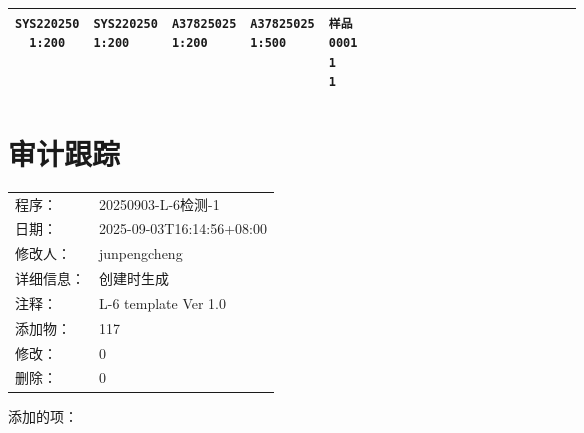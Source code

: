 \documentclass[UTF8,10pt,a4paper,fontset=fandol]{ctexart}
\newcommand{\fieldvalue}[1]{#1}
\begin{document}
\begin{center}
\begin{tabular}{c|*{12}{p{0.055\linewidth}|}}
\fieldvalue{\texttt{SYS220250\\1:200}} &
\fieldvalue{\texttt{SYS220250\\1:200}} &
\fieldvalue{\texttt{A37825025\\1:200}} &
\fieldvalue{\texttt{A37825025\\1:500}} &
\fieldvalue{\texttt{样品0001\\1\\1}} &
\\ \hline
\end{tabular}
\end{center}

\bigskip

\section*{审计跟踪}

\begin{tabular}{@{}ll@{}}
程序：&
\fieldvalue{20250903-L-6检测-1}\\
日期：&
\fieldvalue{2025-09-03T16:14:56+08:00}\\
修改人：&
\fieldvalue{junpengcheng}\\
详细信息：&
\fieldvalue{创建时生成}\\
注释：&
\fieldvalue{L-6 template Ver 1.0}\\
添加物：&
\fieldvalue{117}\\
修改：&
\fieldvalue{0}\\
删除：&
\fieldvalue{0}
\end{tabular}

\smallskip
添加的项：
\end{document}
